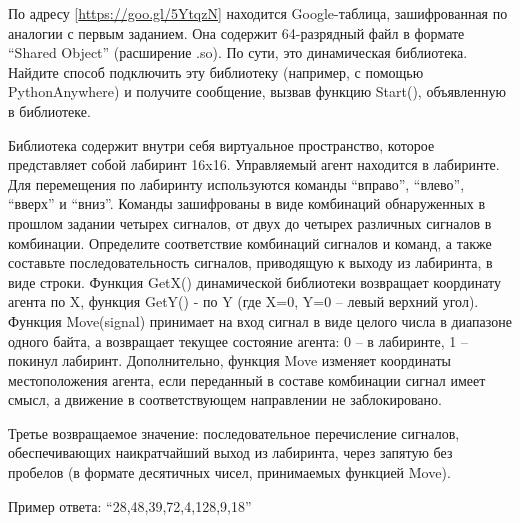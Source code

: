 
По адресу [\url{https://goo.gl/5YtqzN}] находится Google-таблица, зашифрованная по аналогии с первым заданием. Она содержит 64-разрядный файл в формате “Shared Object” (расширение .so). По сути, это динамическая библиотека. Найдите способ подключить эту библиотеку (например, с помощью PythonAnywhere) и получите сообщение, вызвав функцию Start(), объявленную в библиотеке.

Библиотека содержит внутри себя виртуальное пространство, которое представляет собой лабиринт 16x16. Управляемый агент находится в лабиринте. Для перемещения по лабиринту используются команды “вправо”, “влево”, “вверх” и “вниз”. Команды зашифрованы в виде комбинаций обнаруженных в прошлом задании четырех сигналов, от двух до четырех различных сигналов в комбинации. Определите соответствие комбинаций сигналов и команд, а также составьте последовательность сигналов, приводящую к выходу из лабиринта, в виде строки. Функция GetX() динамической библиотеки возвращает координату агента по X, функция GetY() - по Y (где {X=0, Y=0} – левый верхний угол). Функция Move(signal) принимает на вход сигнал в виде целого числа в диапазоне одного байта, а возвращает текущее состояние агента: 0 – в лабиринте, 1 – покинул лабиринт. Дополнительно, функция Move изменяет координаты местоположения агента, если переданный в составе комбинации сигнал имеет смысл, а движение в соответствующем направлении не заблокировано.

Третье возвращаемое значение: последовательное перечисление сигналов, обеспечивающих наикратчайший ﻿выход из лабиринта, через запятую без пробелов (в формате десятичных чисел, принимаемых функцией Move).

Пример ответа: “28,48,39,72,4,128,9,18”

